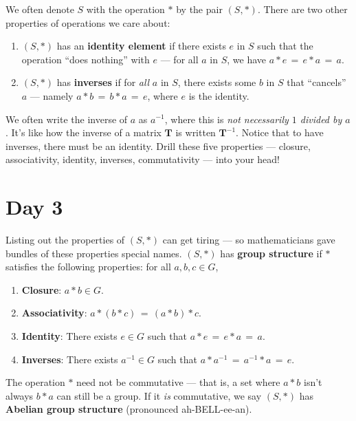 \documentclass[11pt]{article}
\newcommand{\mat}[1]{\mathbf{#1}}
\begin{document}
We often denote $S$ with the operation $\ast$ by the pair $(S, \ast)$. There are two other properties of operations we care about:
\begin{enumerate}
  \item $(S, \ast)$ has an \textbf{identity element} if there exists $e$ in $S$ such that the operation ``does nothing'' with $e$ --- for all $a$ in $S$, we have $a \ast e \, = \, e \ast a \, = \, a$.
  \item $(S, \ast)$ has \textbf{inverses} if for \textit{all} $a$ in $S$, there exists some $b$ in $S$ that ``cancels'' $a$ --- namely $a \ast b \, = \, b \ast a \, = \, e$, where $e$ is the identity. 
\end{enumerate}
We often write the inverse of $a$ as $a^{-1}$, where this is \textit{not necessarily $1$ divided by $a$}. It's like how the inverse of a matrix $\mat{T}$ is written $\mat{T}^{-1}$. Notice that to have inverses, there must be an identity. Drill these five properties --- closure, associativity, identity, inverses, commutativity --- into your head! 

\newpage


\section{Day 3}

Listing out the properties of $(S, \ast)$ can get tiring --- so mathematicians gave bundles of these properties special names. $(S, \ast)$ has \textbf{group structure} if $\ast$ satisfies the following properties: for all $a, b, c \in G$,
\begin{enumerate}
  \item \textbf{Closure}: $a \ast b \in G$.
  \item \textbf{Associativity}: $a \ast (b \ast c) \, = \, (a \ast b) \ast c$.
  \item \textbf{Identity}: There exists $e \in G$ such that $a \ast e \, = \, e \ast a \, = \, a$.
  \item \textbf{Inverses}: There exists $a^{-1} \in G$ such that $a \ast a^{-1} \, = \, a^{-1} \ast a \, = \, e$.
\end{enumerate}
The operation $\ast$ need not be commutative --- that is, a set where $a \ast b$ isn't always $b \ast a$ can still be a group. If it \textit{is} commutative, we say $(S, \ast)$ has \textbf{Abelian group structure} (pronounced ah-BELL-ee-an).
\end{document}
